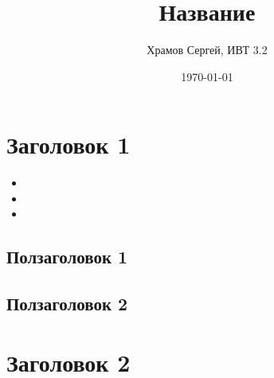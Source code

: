 \documentclass[a4paper,12pt]{article} %
\author{Храмов Сергей, ИВТ 3.2}
\title{Название}
\date{\today}
\begin{document}
\maketitle
\newpage
\parindent=1cm
\section*{Заголовок 1}


\hspace*{1cm}

\begin{itemize}
\item
\item
\item
\end{itemize}

\subsection*{Ползаголовок 1}


\hspace*{1cm}

\subsection*{Ползаголовок 2}


\hspace*{1cm}

\section*{Заголовок 2}


\hspace*{1cm}
\end{document}
